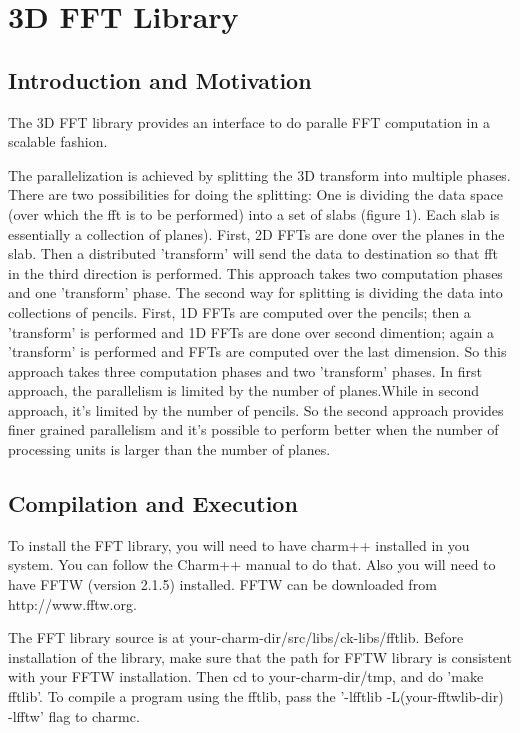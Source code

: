 
\section{3D FFT Library}
\subsection{Introduction and Motivation}
The 3D FFT library provides an interface to do paralle FFT computation
in a scalable fashion. 

The parallelization is achieved by splitting the 3D transform into
multiple phases. There are two possibilities for doing the splitting:
One is dividing the data space (over which the fft is to be performed)
into a set of slabs (figure 1). Each slab is essentially a collection
of planes). First, 2D FFTs are done over the planes in the slab. Then
a distributed 'transform' will send the data to destination so that
fft in the third direction is performed. This approach takes two
computation phases and one 'transform' phase. The second way for
splitting is dividing the data into collections of pencils. First, 1D
FFTs are computed over the pencils; then a 'transform' is performed
and 1D FFTs are done over second dimention; again a 'transform' is
performed and FFTs are computed over the last dimension. So this
approach takes three computation phases and two 'transform' phases. In
first approach, the parallelism is limited by the number of
planes.While in second approach, it's limited by the number of
pencils. So the second approach provides finer grained parallelism and
it's possible to perform better when the number of processing units is
larger than the number of planes.

\subsection{Compilation and Execution}

To install the FFT library, you will need to have charm++ installed in
you system. You can follow the Charm++ manual to do that. Also you
will need to have FFTW (version 2.1.5) installed. FFTW can be
downloaded from http://www.fftw.org.

The FFT library source is at
your-charm-dir/src/libs/ck-libs/fftlib. Before installation of the
library, make sure that the path for FFTW library is consistent with
your FFTW installation. Then cd to your-charm-dir/tmp, and do 'make
fftlib'. To compile a program using the fftlib, pass the '-lfftlib
-L(your-fftwlib-dir) -lfftw' flag to charmc.


